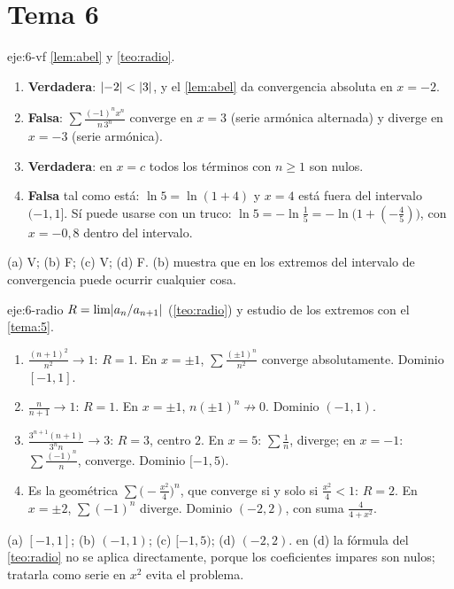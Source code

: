 \section{Tema 6}

\begin{solucion}{eje:6-vf}
\planteamiento \cref{lem:abel} y \cref{teo:radio}.
\pasos
\begin{enumerate}[label=(\alph*)]
  \item \textbf{Verdadera}: $\lvert-2\rvert<\lvert3\rvert$, y el \cref{lem:abel} da convergencia absoluta en $x=-2$.
  \item \textbf{Falsa}: $\sum\frac{(-1)^{n}x^{n}}{n\,3^{n}}$ converge en $x=3$ (serie armónica alternada) y diverge en $x=-3$ (serie armónica).
  \item \textbf{Verdadera}: en $x=c$ todos los términos con $n\ge1$ son nulos.
  \item \textbf{Falsa} tal como está: $\ln5=\ln(1+4)$ y $x=4$ está fuera del intervalo $(-1,1]$. Sí puede usarse con un truco: $\ln5=-\ln\frac15=-\ln\bigl(1+(-\frac45)\bigr)$, con $x=-0{,}8$ dentro del intervalo.
\end{enumerate}
\resultado (a) V; (b) F; (c) V; (d) F.
\comprobacion (b) muestra que en los extremos del intervalo de convergencia puede ocurrir cualquier cosa.
\end{solucion}

\begin{solucion}{eje:6-radio}
\planteamiento $R=\lim\lvert a_n/a_{n+1}\rvert$ (\cref{teo:radio}) y estudio de los extremos con el \cref{tema:5}.
\pasos
\begin{enumerate}[label=(\alph*)]
  \item $\frac{(n+1)^{2}}{n^{2}}\to1$: $R=1$. En $x=\pm1$, $\sum\frac{(\pm1)^{n}}{n^{2}}$ converge absolutamente. Dominio $[-1,1]$.
  \item $\frac{n}{n+1}\to1$: $R=1$. En $x=\pm1$, $n(\pm1)^{n}\not\to0$. Dominio $(-1,1)$.
  \item $\frac{3^{n+1}(n+1)}{3^{n}n}\to3$: $R=3$, centro $2$. En $x=5$: $\sum\frac1n$, diverge; en $x=-1$: $\sum\frac{(-1)^{n}}{n}$, converge. Dominio $[-1,5)$.
  \item Es la geométrica $\sum\bigl(-\frac{x^{2}}{4}\bigr)^{n}$, que converge si y solo si $\frac{x^{2}}{4}<1$: $R=2$. En $x=\pm2$, $\sum(-1)^{n}$ diverge. Dominio $(-2,2)$, con suma $\frac{4}{4+x^{2}}$.
\end{enumerate}
\resultado (a) $[-1,1]$; (b) $(-1,1)$; (c) $[-1,5)$; (d) $(-2,2)$.
\comprobacion en (d) la fórmula del \cref{teo:radio} no se aplica directamente, porque los coeficientes impares son nulos; tratarla como serie en $x^{2}$ evita el problema.
\end{solucion}

